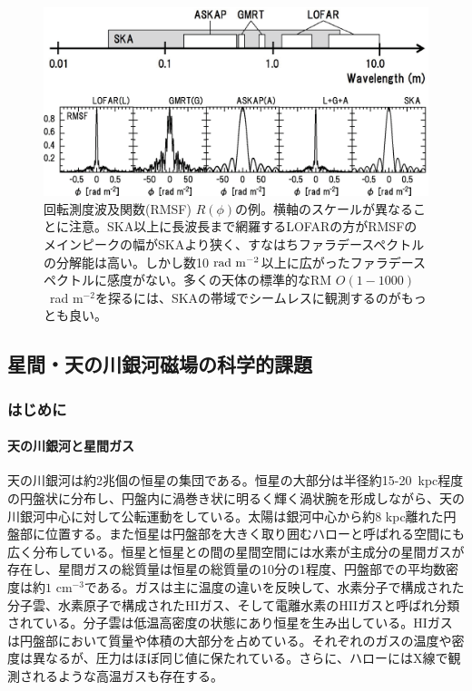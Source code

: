 \begin{figure}[tbp]
\begin{center}
\includegraphics[width=0.7\linewidth]{magnetism/c06.s1.ss1.f3.eps}
\caption{回転測度波及関数(RMSF) $R(\phi)$の例\citep{2014PASJ...66...65A}。横軸のスケールが異なることに注意。SKA以上に長波長まで網羅するLOFARの方がRMSFのメインピークの幅がSKAより狭く、すなはちファラデースペクトルの分解能は高い。しかし数10 ${\rm rad~m^{-2}}$以上に広がったファラデースペクトルに感度がない。多くの天体の標準的なRM $O(1-1000)$~rad m$^{-2}$を探るには、SKAの帯域でシームレスに観測するのがもっとも良い。
}\label{c06.s1.ss1.f3}
\end{center}
\end{figure}


\subsection{星間・天の川銀河磁場の科学的課題}
\label{c06.s1.ss2}

\subsubsection{はじめに}
\label{c06.s1.ss2.sss1}

\paragraph{天の川銀河と星間ガス}

天の川銀河は約2兆個の恒星の集団である。恒星の大部分は半径約15-20~kpc程度の円盤状に分布し、円盤内に渦巻き状に明るく輝く渦状腕を形成しながら、天の川銀河中心に対して公転運動をしている。太陽は銀河中心から約8 kpc離れた円盤部に位置する。また恒星は円盤部を大きく取り囲むハローと呼ばれる空間にも広く分布している。恒星と恒星との間の星間空間には水素が主成分の星間ガスが存在し、星間ガスの総質量は恒星の総質量の10分の1程度、円盤部での平均数密度は約$1$ cm$^{-3}$である。ガスは主に温度の違いを反映して、水素分子で構成された分子雲、水素原子で構成されたHIガス、そして電離水素のHIIガスと呼ばれ分類されている。分子雲は低温高密度の状態にあり恒星を生み出している。HIガスは円盤部において質量や体積の大部分を占めている。それぞれのガスの温度や密度は異なるが、圧力はほぼ同じ値に保たれている。さらに、ハローにはX線で観測されるような高温ガスも存在する。

